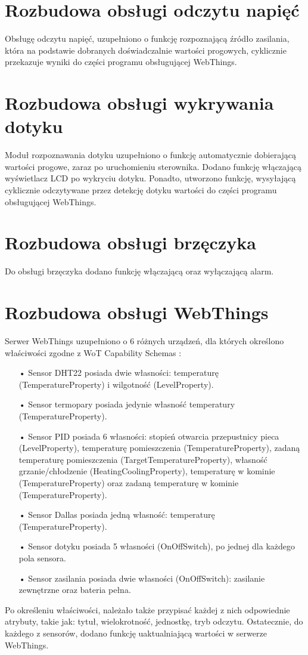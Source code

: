 \documentclass[11pt]{report}
\begin{document}
 \section{Rozbudowa obsługi odczytu napięć}
 Obsługę odczytu napięć, uzupełniono o funkcję rozpoznającą źródło zasilania, która na podstawie dobranych doświadczalnie wartości progowych, cyklicznie przekazuje wyniki do części programu obsługującej WebThings.
 
 \section{Rozbudowa obsługi wykrywania dotyku}
 Moduł rozpoznawania dotyku uzupełniono o funkcję automatycznie dobierającą wartości progowe, zaraz po uruchomieniu sterownika. Dodano funkcję włączającą wyświetlacz LCD po wykryciu dotyku. Ponadto, utworzono funkcję, wysyłającą cyklicznie odczytywane przez detekcję dotyku wartości do części programu obsługującej WebThings.
 
 \section{Rozbudowa obsługi brzęczyka}
 Do obsługi brzęczyka dodano funkcję włączającą oraz wyłączającą alarm.
 
 \section{Rozbudowa obsługi WebThings}
 Serwer WebThings uzupełniono o 6 różnych urządzeń, dla których określono właściwości zgodne z WoT Capability Schemas \cite{wotschemas2020}:
 \begin{enumerate}
 \item[•] Sensor DHT22 posiada dwie własności: temperaturę (TemperatureProperty) i wilgotność (LevelProperty).
 \item[•] Sensor termopary posiada jedynie własność temperatury (TemperatureProperty).
 \item[•] Sensor PID posiada 6 własności: stopień otwarcia przepustnicy pieca (LevelProperty), temperaturę pomieszczenia (TemperatureProperty), zadaną temperaturę pomieszczenia (TargetTemperatureProperty), własność grzanie/chłodzenie (HeatingCoolingProperty), temperaturę w kominie (TemperatureProperty) oraz zadaną temperaturę w kominie (TemperatureProperty).
 \item[•] Sensor Dallas posiada jedną własność: temperaturę (TemperatureProperty).
 \item[•] Sensor dotyku posiada 5 własności (OnOffSwitch), po jednej dla każdego pola sensora.
 \item[•] Sensor zasilania posiada dwie własności (OnOffSwitch): zasilanie zewnętrzne oraz bateria pełna.
 \end{enumerate}
 Po określeniu właściwości, należało także przypisać każdej z nich odpowiednie atrybuty, takie jak: tytuł, wielokrotność, jednostkę, tryb odczytu.
 Ostatecznie, do każdego z sensorów, dodano funkcję uaktualniającą wartości w serwerze WebThings.
\end{document}

